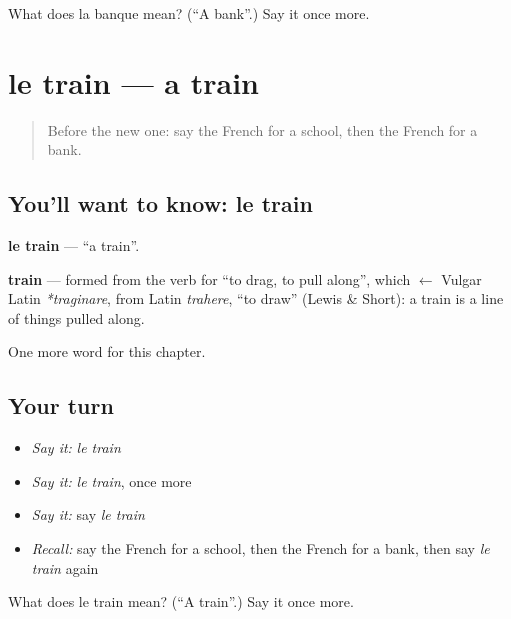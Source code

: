 \begin{tcolorbox}[breakable,colback=teal!4,colframe=teal!35!black,title={Before you move on}]
What does la banque mean? (\textquotedblleft{}A bank\textquotedblright{}.) Say it once more.
\end{tcolorbox}
\section[le train]{le train — a train}

\label{lesson:FR-C99-train}



\begin{quote}
Before the new one: say the French for a school, then the French for a bank.
\end{quote}

\subsection*{You'll want to know: le train}
\textbf{le train} — \textquotedblleft{}a train\textquotedblright{}.

\begin{cousinweb}
\textbf{train} — formed from the verb for \textquotedblleft{}to drag, to pull along\textquotedblright{}, which $\leftarrow$ Vulgar Latin \emph{*traginare}, from Latin \emph{trahere}, \textquotedblleft{}to draw\textquotedblright{} (Lewis \& Short): a train is a line of things pulled along.
\end{cousinweb}

\begin{grammarlens}[title={What you've built}]
One more word for this chapter.
\end{grammarlens}

\subsection*{Your turn}
\begin{itemize}
\raggedright
  \item \emph{Say it:} \emph{le train}
  \item \emph{Say it:} \emph{le train}, once more
  \item \emph{Say it:} say \emph{le train}
  \item \emph{Recall:} say the French for a school, then the French for a bank, then say \emph{le train} again
\end{itemize}

\begin{tcolorbox}[breakable,colback=teal!4,colframe=teal!35!black,title={Before you move on}]
What does le train mean? (\textquotedblleft{}A train\textquotedblright{}.) Say it once more.
\end{tcolorbox}

